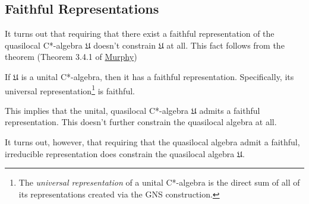 \subsection{Faithful Representations}\label{subsec:faithful-representations}
It turns out that requiring that there exist a faithful representation of the quasilocal C*-algebra $\mathfrak{U}$ doesn't constrain $\mathfrak{U}$ at all. This fact follows from the theorem (Theorem 3.4.1 of \href{https://doi.org/10.1016/C2009-0-22289-6}{Murphy})
\begin{theorem}
If $\mathfrak{U}$ is a unital C*-algebra, then it has a faithful representation. Specifically, its universal representation\footnote{The \textit{universal representation} of a unital C*-algebra is the direct sum of all of its representations created via the GNS construction.} is faithful.
\end{theorem}
\noindent This implies that the unital, quasilocal C*-algebra $\mathfrak{U}$ admits a faithful representation. This doesn't further constrain the quasilocal algebra at all.

It turns out, however, that requiring that the quasilocal algebra admit a faithful, irreducible representation does constrain the quasilocal algebra $\mathfrak{U}$.
